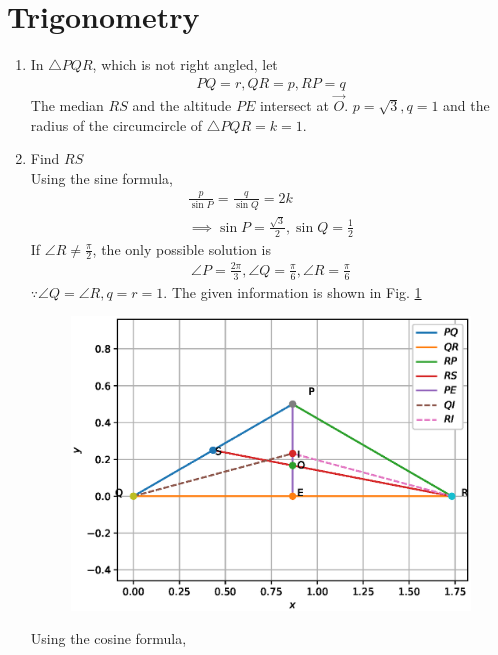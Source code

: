 \documentclass[journal,12pt,twocolumn]{IEEEtran}
\renewcommand\thesection{\arabic{section}}
\begin{document}
\section{Trigonometry}
\begin{enumerate}[label=\thesection.\arabic*
,ref=\thesection.\theenumi]

\item In $\triangle PQR$, which is not right angled, let
\begin{align}
PQ = r, QR = p, RP = q
\end{align}
%
The median $RS$ and the altitude $PE$  intersect at $\vec{O}$. $p =\sqrt{3}, q = 1$ and the radius of the circumcircle  of $\triangle PQR = k = 1$.  
\item Find  $RS$
\\
\solution Using the sine formula,
\begin{align}
\frac{p}{\sin P}=\frac{q}{\sin Q} = 2k
\\
\implies \sin P = \frac{\sqrt{3}}{2}, \sin Q = \frac{1}{2}
\end{align}
If $\angle R \ne \frac{\pi}{2}$, the only possible solution is 
\begin{align}
\angle P = \frac{2\pi}{3},
\angle Q = \frac{\pi}{6},
\angle R = \frac{\pi}{6}
\end{align}
%
$\because \angle Q = \angle R, q = r = 1$.  The given information is shown in Fig. \ref{fig:2019_8}
\begin{figure}
\centering
\includegraphics[width=\columnwidth]{./figs/2019_8.eps}
\caption{}
\label{fig:2019_8}
\end{figure}
%
Using the cosine formula, 
\begin{align}

\end{align}
\end{enumerate}
\end{document}
